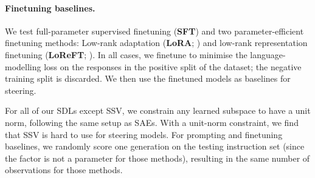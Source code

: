 \documentclass{article}
\theoremstyle{plain}
\theoremstyle{definition}
\theoremstyle{remark}
\newcommand{\methodtag}[2]{%
  \tikz[baseline=(char.base)]{%
    \node[
      fill=#1,
      rounded corners=2pt,
      text=white,
      font=\bfseries,
      minimum width=1em,
      minimum height=1em,
      align=center,
      inner sep=0pt
    ](char){#2};%
  }%
}
\newcommand{\steeringtag}{\protect\methodtag{steeringcolor}{S}}
\begin{document}
\paragraph{\steeringtag{} Finetuning baselines.} We test full-parameter supervised finetuning (\textbf{SFT}) and two parameter-efficient finetuning methods: Low-rank adaptation (\textbf{LoRA}; \citealp{hu2022lora}) and low-rank representation finetuning (\textbf{LoReFT}; \citealp{wu2024reft}). In all cases, we finetune to minimise the language-modelling loss on the responses in the positive split of the dataset; the negative training split is discarded. We then use the finetuned models as baselines for steering.

For all of our SDLs except SSV, we constrain any learned subspace to have a unit norm, following the same setup as SAEs. With a unit-norm constraint, we find that SSV is hard to use for steering models. For prompting and finetuning baselines, we randomly score one generation on the testing instruction set (since the factor is not a parameter for those methods), resulting in the same number of observations for those methods.






\end{document}
